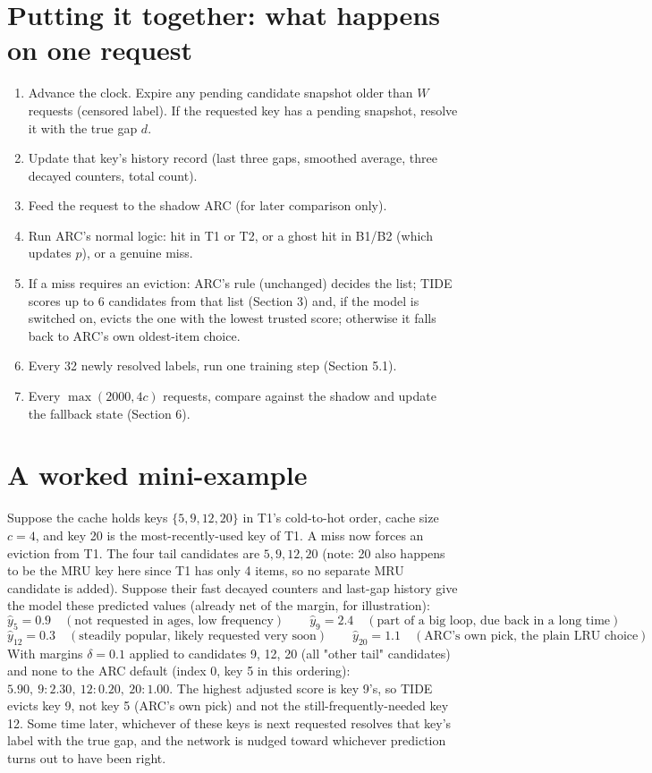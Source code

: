 \documentclass[10pt,a4paper]{article}
\begin{document}
\section{Putting it together: what happens on one request}
\begin{enumerate}
  \item Advance the clock. Expire any pending candidate snapshot older than $W$ requests (censored
        label). If the requested key has a pending snapshot, resolve it with the true gap $d$.
  \item Update that key's history record (last three gaps, smoothed average, three decayed counters,
        total count).
  \item Feed the request to the shadow ARC (for later comparison only).
  \item Run ARC's normal logic: hit in T1 or T2, or a ghost hit in B1/B2 (which updates $p$), or a genuine
        miss.
  \item If a miss requires an eviction: ARC's rule (unchanged) decides the list; TIDE scores up to 6
        candidates from that list (Section 3) and, if the model is switched on, evicts the one with the
        lowest trusted score; otherwise it falls back to ARC's own oldest-item choice.
  \item Every 32 newly resolved labels, run one training step (Section 5.1).
  \item Every $\max(2000,4c)$ requests, compare against the shadow and update the fallback state
        (Section 6).
\end{enumerate}

\section{A worked mini-example}
Suppose the cache holds keys $\{5, 9, 12, 20\}$ in T1's cold-to-hot order, cache size $c=4$, and key 20 is
the most-recently-used key of T1. A miss now forces an eviction from T1. The four tail candidates are
$5, 9, 12, 20$ (note: 20 also happens to be the MRU key here since T1 has only 4 items, so no separate
MRU candidate is added). Suppose their fast decayed counters and last-gap history give the model these
predicted values (already net of the margin, for illustration):
\[
\hat{y}_5 = 0.9 \quad(\text{not requested in ages, low frequency})
\qquad
\hat{y}_9 = 2.4 \quad(\text{part of a big loop, due back in a long time})
\]
\[
\hat{y}_{12} = 0.3 \quad(\text{steadily popular, likely requested very soon})
\qquad
\hat{y}_{20} = 1.1 \quad(\text{ARC's own pick, the plain LRU choice})
\]
With margins $\delta = 0.1$ applied to candidates 9, 12, 20 (all "other tail" candidates) and none to the
ARC default (index 0, key 5 in this ordering): $5.90,\ 9\!:2.30,\ 12\!:0.20,\ 20\!:1.00$. The
highest adjusted score is key 9's, so TIDE evicts key 9, not key 5 (ARC's own pick) and not the
still-frequently-needed key 12. Some time later, whichever of these keys is next requested resolves that
key's label with the true gap, and the network is nudged toward whichever prediction turns out to have
been right.
\end{document}
